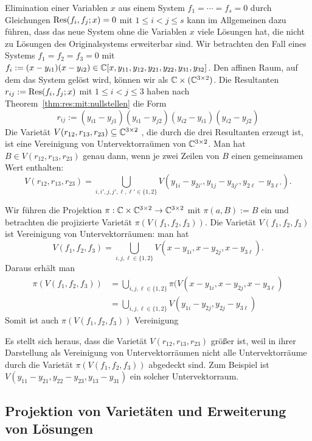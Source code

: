 \documentclass[11pt]{article}
\numberwithin{equation}{section}
\begin{document}
\begin{remark}
	Elimination einer Variablen $x$ aus einem System $f_1=\cdots = f_s =0$ durch Gleichungen $\operatorname{Res}(f_i,f_j;x)=0$ mit $1 \le i < j \le s$ kann im Allgemeinen dazu führen, dass das neue System ohne die Variablen $x$ viele Lösungen hat, die nicht zu Lösungen des Originalsystems erweiterbar sind. Wir betrachten den Fall eines Systems $f_1 = f_2 = f_3=0$ mit $f_i := (x-y_{i1})(x-y_{i2}) \in \mathbb{C}[x,y_{11},y_{12},y_{21},y_{22},y_{31},y_{32}]$. Den affinen Raum, auf dem das System gelöst wird, können wir als $\mathbb{C} \times (\mathbb{C}^{3 \times 2})$. Die Resultanten $r_{ij} := \operatorname{Res}(f_i,f_j;x)$ mit $1 \le i < j \le 3$ haben nach Theorem~\ref{thm:res:mit:nullstellen}  die Form
	\[
			r_{ij} := (y_{i1} - y_{j1} ) (y_{i1} - y_{j2}) (y_{i2} - y_{i1})(y_{i2} - y_{j2})
	\]
	Die Varietät $V(r_{12}, r_{13},r_{23}) \subseteq \mathbb{C}^{3 \times 2}$ , die durch die drei Resultanten erzeugt ist, ist eine Vereinigung von Untervektorraümen von $\mathbb{C}^{3 \times 2}$. Man hat $B \in V(r_{12},r_{13},r_{23})$ genau dann, wenn je zwei Zeilen von $B$ einen gemeinsamen Wert enthalten:
	\[
			V(r_{12},r_{13},r_{23}) = \bigcup_{i,i',j,j',\ell,\ell' \in \{1,2\}} V(y_{1 i} - y_{2 i'}, y_{1 j} - y_{3 j'} , y_{2 \ell} - y_{3 \ell'} ). 
	\]
	
	Wir führen die Projektion $\pi : \mathbb{C} \times \mathbb{C}^{3 \times 2} \to \mathbb{C}^{3 \times 2}$ mit $\pi(a,B) :=B$ ein und betrachten die projizierte Varietät $\pi(V(f_1,f_2,f_3))$. Die Varietät $V(f_1,f_2,f_3)$ ist Vereinigung von Untervektorräumen: man hat 
	\[
			V(f_1,f_2,f_3) = \bigcup_{i,j,\ell \in \{1,2\}} V(x- y_{1i}, x-y_{2j}, x-y_{3\ell}). 
	\]
	Daraus erhält man 
	\begin{align*}
		\pi(V(f_1,f_2,f_3)) &  = \bigcup_{i,j,\ell \in \{1,2\}} \pi( V(x-y_{1i},x-y_{2j}, x- y_{3\ell}) 
		\\ & = \bigcup_{i,j,\ell \in \{1,2\}} V(y_{1i} - y_{2j}, y_{2j} - y_{3\ell}) 
	\end{align*}
	Somit ist auch $\pi(V(f_1,f_2,f_3))$ Vereinigung 
	
	Es stellt sich heraus, dass die Varietät $V(r_{12}, r_{13}, r_{23})$ größer ist, weil in ihrer Darstellung als Vereinigung von Untervektorräumen nicht alle Untervektorräume durch die Varietät $\pi(V(f_1,f_2,f_3))$ abgedeckt sind. Zum Beispiel ist $V(y_{11} - y_{21}, y_{22}- y_{23}, y_{13} - y_{31})$ ein solcher Untervektorraum. 
\end{remark} 

\subsection{Projektion von Varietäten und Erweiterung von Lösungen}
\end{document}
